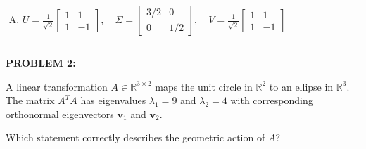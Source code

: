 \documentclass[12pt]{amsart}
\newcommand{\divider}{
  \vspace{-1em} %
  \noindent
  \raisebox{-0.15ex}{\textbullet}%
  \hspace{0.5em}%
  \rule[0.5ex]{0.95\textwidth}{1.0pt}%
  \hspace{0.5em}%
  \raisebox{-0.15ex}{\textbullet}%
  \vspace{0em} %
}
\begin{document}
\begin{enumerate}[(A)]
\item $U = \frac{1}{\sqrt{2}}\begin{bmatrix} 1 & 1 \\ 1 & -1 \end{bmatrix}, \quad \Sigma = \begin{bmatrix} 3/2 & 0 \\ 0 & 1/2 \end{bmatrix}, \quad V = \frac{1}{\sqrt{2}}\begin{bmatrix} 1 & 1 \\ 1 & -1 \end{bmatrix}$
\end{enumerate}

% 

\divider

\newpage


{\bf PROBLEM 2:}

A linear transformation $A \in \mathbb{R}^{3 \times 2}$ maps the unit circle in $\mathbb{R}^2$ to an ellipse in $\mathbb{R}^3$. The matrix $A^TA$ has eigenvalues $\lambda_1 = 9$ and $\lambda_2 = 4$ with corresponding orthonormal eigenvectors $\mathbf{v}_1$ and $\mathbf{v}_2$.

Which statement correctly describes the geometric action of $A$?
\end{document}
